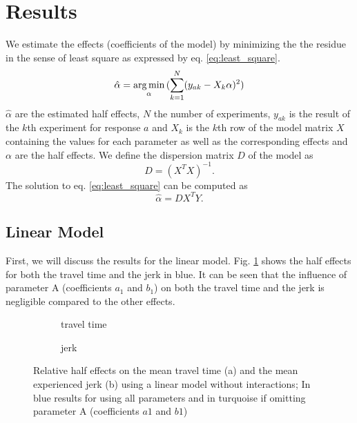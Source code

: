 \section{Results}
We estimate the effects (coefficients of the model) by minimizing the the residue in the sense of least square as expressed by eq. \ref{eq:least_square}.
\begin{equation}\label{eq:least_square}
	\hat\alpha =  \operatorname*{arg\,min}_{\alpha}{(\sum_{k = 1}^{N} (y_{ak} -  X_{k}\alpha)^2)}
\end{equation}
$\hat\alpha$ are the estimated half effects, $N$ the number of experiments, $y_{ak}$ is the result of the $k$th experiment for response $a$ and $X_k$ is the $k$th row of the model matrix $X$ containing the values for each parameter as well as the corresponding effects and $\alpha$ are the half effects.
We define the dispersion matrix $D$ of the model as
\begin{equation}
	D = (X^T X)^{-1}.
\end{equation}
The solution to eq. \ref{eq:least_square} can be computed as
\begin{equation}
	\hat\alpha = D X^{T} Y.
\end{equation}


\subsection{Linear Model}
First, we will discuss the results for the linear model.
Fig. \ref{fig:effects_lin} shows the half effects for both the travel time and the jerk in blue. It can be seen that the influence of parameter A (coefficients $a_1$ and $b_1$) on both the travel time and the jerk is negligible compared to the other effects.
\begin{figure}[h]
    \centering
    \begin{subfigure}[b]{0.5\textwidth}
		\setlength{\abovecaptionskip}{1pt plus 3pt minus 0pt}	
	    
	    \caption{travel time}
	\end{subfigure}
    \begin{subfigure}[b]{0.5\textwidth}
	    \setlength{\abovecaptionskip}{1pt plus 3pt minus 0pt}
	    
   	    \caption{jerk}
	\end{subfigure}
	
    \caption{Relative half effects on the mean travel time (a) and the mean experienced jerk (b) using a linear model without interactions; In blue results for using all parameters and in turquoise if omitting parameter A (coefficients $a1$ and $b1$)}\label{fig:effects_lin}
\end{figure} 

